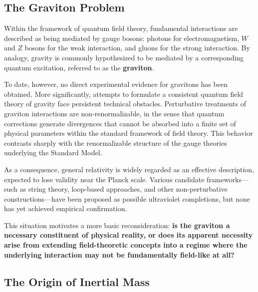 \documentclass[12pt,letterpaper]{article}
\begin{document}

\subsection{The Graviton Problem}
\label{subsec:graviton}

Within the framework of quantum field theory, fundamental interactions are described as being mediated by gauge bosons: photons for electromagnetism, $W$ and $Z$ bosons for the weak interaction, and gluons for the strong interaction. By analogy, gravity is commonly hypothesized to be mediated by a corresponding quantum excitation, referred to as the \textbf{graviton}.

To date, however, no direct experimental evidence for gravitons has been obtained. More significantly, attempts to formulate a consistent quantum field theory of gravity face persistent technical obstacles. Perturbative treatments of graviton interactions are non-renormalizable, in the sense that quantum corrections generate divergences that cannot be absorbed into a finite set of physical parameters within the standard framework of field theory. This behavior contrasts sharply with the renormalizable structure of the gauge theories underlying the Standard Model.

As a consequence, general relativity is widely regarded as an effective description, expected to lose validity near the Planck scale. Various candidate frameworks—such as string theory, loop-based approaches, and other non-perturbative constructions—have been proposed as possible ultraviolet completions, but none has yet achieved empirical confirmation.

This situation motivates a more basic reconsideration: \textbf{is the graviton a necessary constituent of physical reality, or does its apparent necessity arise from extending field-theoretic concepts into a regime where the underlying interaction may not be fundamentally field-like at all?}


\subsection{The Origin of Inertial Mass}
\label{subsec:inertial_mass}
\end{document}
